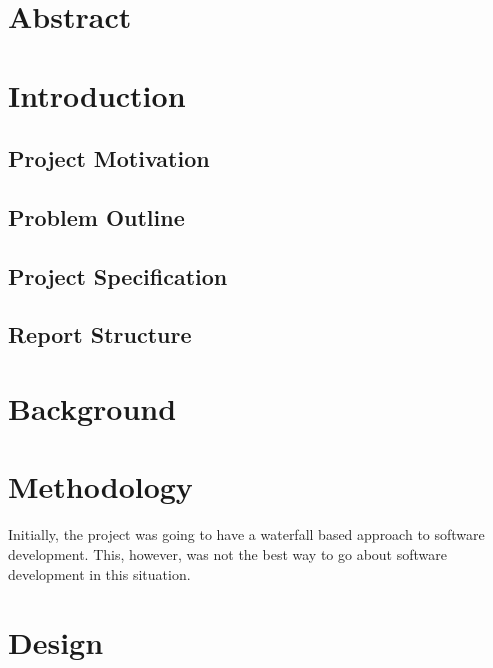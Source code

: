 \documentclass{article}
\begin{document}
\section{Abstract}

\section{Introduction}

\subsection{Project Motivation}

\subsection{Problem Outline}

\subsection{Project Specification}

\subsection{Report Structure}

\section{Background}

\section{Methodology}

Initially, the project was going to have a waterfall based approach to software development. This, however, was not the best way to go about software development in this situation. 


\section{Design}



\end{document}
